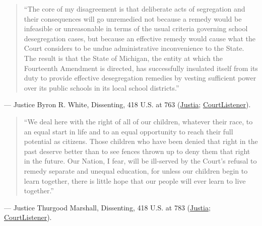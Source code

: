 \documentclass[12pt]{article}
\begin{document}
\begin{quote}
``The core of my disagreement is that deliberate acts of segregation and their consequences will go unremedied not because a remedy would be infeasible or unreasonable in terms of the usual criteria governing school desegregation cases, but because an effective remedy would cause what the Court considers to be undue administrative inconvenience to the State. The result is that the State of Michigan, the entity at which the Fourteenth Amendment is directed, has successfully insulated itself from its duty to provide effective desegregation remedies by vesting sufficient power over its public schools in its local school districts.''
\end{quote}
\noindent --- Justice Byron R. White, Dissenting, 418 U.S. at 763 (\href{https://supreme.justia.com/cases/federal/us/418/717/}{Justia}; \href{https://www.courtlistener.com/opinion/109102/milliken-v-bradley/}{CourtListener}).

\begin{quote}
``We deal here with the right of all of our children, whatever their race, to an equal start in life and to an equal opportunity to reach their full potential as citizens. Those children who have been denied that right in the past deserve better than to see fences thrown up to deny them that right in the future. Our Nation, I fear, will be ill-served by the Court's refusal to remedy separate and unequal education, for unless our children begin to learn together, there is little hope that our people will ever learn to live together.''
\end{quote}
\noindent --- Justice Thurgood Marshall, Dissenting, 418 U.S. at 783 (\href{https://supreme.justia.com/cases/federal/us/418/717/}{Justia}; \href{https://www.courtlistener.com/opinion/109102/milliken-v-bradley/}{CourtListener}).
\end{document}
